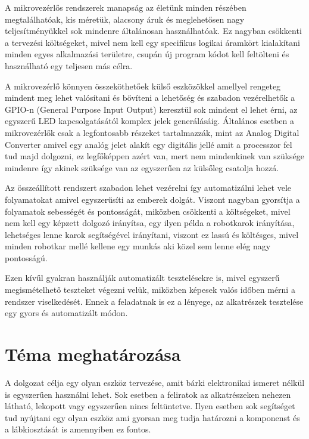 
A mikrovezérlős rendszerek manapság az életünk minden részében megtalálhatóak, kis méretük, 
alacsony áruk és meglehetősen nagy teljesítményükkel sok mindenre általánosan használhatóak. 
Ez nagyban csökkenti a tervezési költségeket, mivel nem kell egy specifikus logikai áramkört 
kialakítani minden egyes alkalmazási területre, csupán új program kódot kell feltölteni és 
használható egy teljesen más célra.

A mikrovezérlő könnyen összeköthetőek külső eszközökkel amellyel rengeteg mindent meg lehet 
valósítani és bővíteni a lehetőség és szabadon vezérelhetők a GPIO-n (General Purpose Input 
Output) keresztül sok mindent el lehet érni, az egyszerű LED kapcsolgatásától komplex jelek 
generálásáig. Általános esetben a mikrovezérlők csak a legfontosabb részeket tartalmazzák, 
mint az Analog Digital Converter amivel egy analóg jelet alakít egy digitális jellé amit a 
processzor fel tud majd dolgozni, ez legfőképpen azért van, mert nem mindenkinek van szüksége 
mindenre így akinek szüksége van az egyszerűen az külsőleg csatolja hozzá. 

Az összeállított rendszert szabadon lehet vezérelni így automatizálni lehet vele folyamatokat 
amivel egyszerűsíti az emberek dolgát. Viszont nagyban gyorsítja a folyamatok sebességét és 
pontosságát, miközben csökkenti a költségeket, mivel nem kell egy képzett dolgozó irányítsa, 
egy ilyen példa a robotkarok irányítása, lehetséges lenne karok segítségével irányítani, 
viszont ez lassú és költésges, mivel minden robotkar mellé kellene egy munkás aki közel sem 
lenne elég nagy pontosságú. 

Ezen kívűl gyakran használják automatizált tesztelésekre is, mivel egyszerű megismételhető 
teszteket végezni velük, miközben képesek valós időben mérni a rendszer viselkedését. Ennek 
a feladatnak is ez a lényege, az alkatrészek tesztelése egy gyors és automatizált módon. 


\section{Téma meghatározása}

A dolgozat célja egy olyan eszköz tervezése, amit bárki elektronikai ismeret nélkül is egyszerűen 
használni lehet. Sok esetben a feliratok az alkatrészeken nehezen látható, lekopott vagy 
egyszerűen nincs feltüntetve. Ilyen esetben sok segítséget tud nyújtani egy olyan eszköz ami 
gyorsan meg tudja határozni a komponenst és a lábkiosztását is amennyiben ez fontos.

